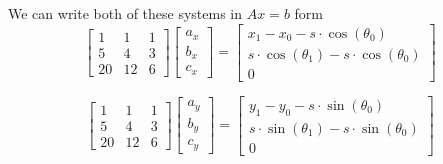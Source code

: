 \documentclass[12pt, letterpaper]{article}
\begin{document}
We can write both of these systems in \(Ax = b\) form
\begin{equation*}
\begin{bmatrix}
1 & 1 & 1 \\
5 & 4 & 3 \\
20 & 12 & 6
\end{bmatrix}
\begin{bmatrix}
a_x \\ b_x \\ c_x
\end{bmatrix}
= \begin{bmatrix}
x_1 - x_0 - s \cdot \cos(\theta_0) \\
s \cdot \cos(\theta_1) - s \cdot \cos(\theta_0) \\
0
\end{bmatrix}
\end{equation*}

\begin{equation*}
\begin{bmatrix}
1 & 1 & 1 \\
5 & 4 & 3 \\
20 & 12 & 6
\end{bmatrix}
\begin{bmatrix}
a_y \\ b_y \\ c_y
\end{bmatrix}
= \begin{bmatrix}
y_1 - y_0 - s \cdot \sin(\theta_0) \\
s \cdot \sin(\theta_1) - s \cdot \sin(\theta_0) \\
0
\end{bmatrix}
\end{equation*}
\end{document}
